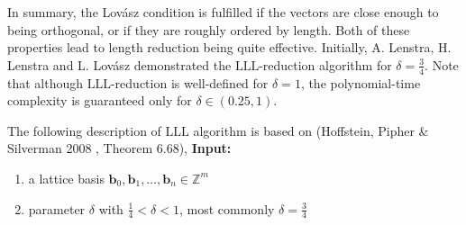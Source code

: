 In summary, the Lovász condition is fulfilled if the vectors are close enough to being orthogonal, or if they are roughly ordered by length. Both of these properties lead to length reduction being quite effective. Initially, A. Lenstra, H. Lenstra and L. Lovász demonstrated the $\mathrm{LLL}$-reduction algorithm for $\delta ={\frac{3}{4}}$. Note that although $\mathrm{LLL}$-reduction is well-defined for $\delta =1$, the polynomial-time complexity is guaranteed only for $\delta \in (0.25,1)$.




The following description of $\mathrm{LLL}$ algorithm is based on (Hoffstein, Pipher \& Silverman 2008 \cite{Hoffstein:2008:IMC:1481183}, Theorem 6.68), \textbf{Input:}

\begin{enumerate}
    \item a lattice basis $\textbf{b}_{0}, \textbf{b}_{1},\dots ,\textbf{b}_{n}\in \mathbb{Z}^{m}$
    \item parameter $\delta$  with ${\frac{1}{4}}<\delta <1$, most commonly $\delta ={\frac{3}{4}}$ 
\end{enumerate}

